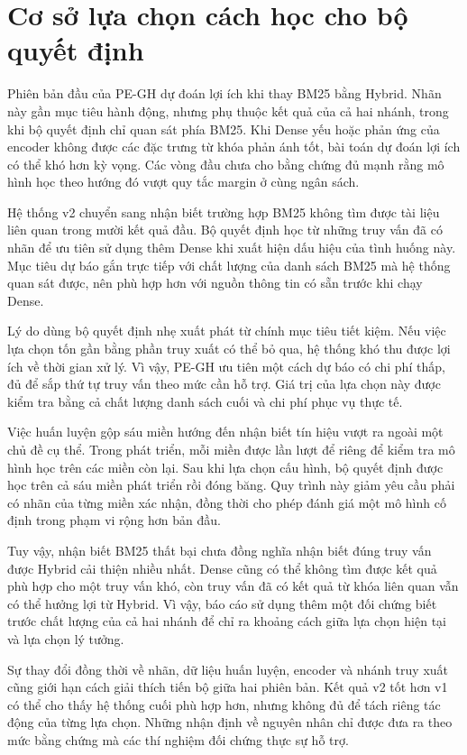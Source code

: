 \section{Cơ sở lựa chọn cách học cho bộ quyết định}
Phiên bản đầu của PE-GH dự đoán lợi ích khi thay BM25 bằng Hybrid. Nhãn này gần mục tiêu hành động, nhưng phụ thuộc kết quả của cả hai nhánh, trong khi bộ quyết định chỉ quan sát phía BM25. Khi Dense yếu hoặc phản ứng của encoder không được các đặc trưng từ khóa phản ánh tốt, bài toán dự đoán lợi ích có thể khó hơn kỳ vọng. Các vòng đầu chưa cho bằng chứng đủ mạnh rằng mô hình học theo hướng đó vượt quy tắc margin ở cùng ngân sách.

Hệ thống v2 chuyển sang nhận biết trường hợp BM25 không tìm được tài liệu liên quan trong mười kết quả đầu. Bộ quyết định học từ những truy vấn đã có nhãn để ưu tiên sử dụng thêm Dense khi xuất hiện dấu hiệu của tình huống này. Mục tiêu dự báo gắn trực tiếp với chất lượng của danh sách BM25 mà hệ thống quan sát được, nên phù hợp hơn với nguồn thông tin có sẵn trước khi chạy Dense.

Lý do dùng bộ quyết định nhẹ xuất phát từ chính mục tiêu tiết kiệm. Nếu việc lựa chọn tốn gần bằng phần truy xuất có thể bỏ qua, hệ thống khó thu được lợi ích về thời gian xử lý. Vì vậy, PE-GH ưu tiên một cách dự báo có chi phí thấp, đủ để sắp thứ tự truy vấn theo mức cần hỗ trợ. Giá trị của lựa chọn này được kiểm tra bằng cả chất lượng danh sách cuối và chi phí phục vụ thực tế.

Việc huấn luyện gộp sáu miền hướng đến nhận biết tín hiệu vượt ra ngoài một chủ đề cụ thể. Trong phát triển, mỗi miền được lần lượt để riêng để kiểm tra mô hình học trên các miền còn lại. Sau khi lựa chọn cấu hình, bộ quyết định được học trên cả sáu miền phát triển rồi đóng băng. Quy trình này giảm yêu cầu phải có nhãn của từng miền xác nhận, đồng thời cho phép đánh giá một mô hình cố định trong phạm vi rộng hơn bản đầu.

Tuy vậy, nhận biết BM25 thất bại chưa đồng nghĩa nhận biết đúng truy vấn được Hybrid cải thiện nhiều nhất. Dense cũng có thể không tìm được kết quả phù hợp cho một truy vấn khó, còn truy vấn đã có kết quả từ khóa liên quan vẫn có thể hưởng lợi từ Hybrid. Vì vậy, báo cáo sử dụng thêm một đối chứng biết trước chất lượng của cả hai nhánh để chỉ ra khoảng cách giữa lựa chọn hiện tại và lựa chọn lý tưởng.

Sự thay đổi đồng thời về nhãn, dữ liệu huấn luyện, encoder và nhánh truy xuất cũng giới hạn cách giải thích tiến bộ giữa hai phiên bản. Kết quả v2 tốt hơn v1 có thể cho thấy hệ thống cuối phù hợp hơn, nhưng không đủ để tách riêng tác động của từng lựa chọn. Những nhận định về nguyên nhân chỉ được đưa ra theo mức bằng chứng mà các thí nghiệm đối chứng thực sự hỗ trợ.

